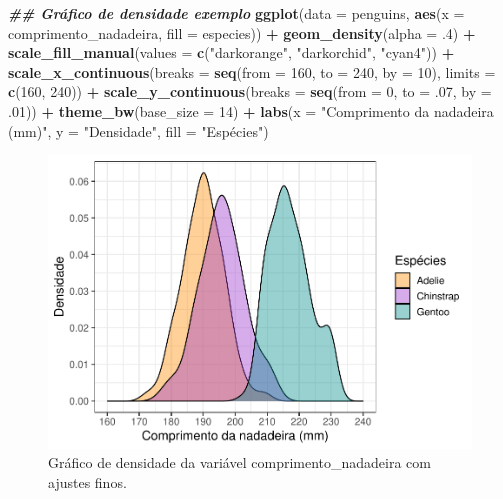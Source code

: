\documentclass[
]{article}
\newenvironment{Shaded}{\begin{snugshade}}{\end{snugshade}}
\newcommand{\AttributeTok}[1]{\textcolor[rgb]{0.13,0.29,0.53}{#1}}
\newcommand{\DecValTok}[1]{\textcolor[rgb]{0.00,0.00,0.81}{#1}}
\newcommand{\DocumentationTok}[1]{\textcolor[rgb]{0.56,0.35,0.01}{\textbf{\textit{#1}}}}
\newcommand{\FunctionTok}[1]{\textcolor[rgb]{0.13,0.29,0.53}{\textbf{#1}}}
\newcommand{\NormalTok}[1]{#1}
\newcommand{\SpecialCharTok}[1]{\textcolor[rgb]{0.81,0.36,0.00}{\textbf{#1}}}
\newcommand{\StringTok}[1]{\textcolor[rgb]{0.31,0.60,0.02}{#1}}
\begin{document}
\begin{Shaded}
\begin{Highlighting}[]
\DocumentationTok{\#\# Gráfico de densidade exemplo}
\FunctionTok{ggplot}\NormalTok{(}\AttributeTok{data =}\NormalTok{ penguins, }\FunctionTok{aes}\NormalTok{(}\AttributeTok{x =}\NormalTok{ comprimento\_nadadeira, }\AttributeTok{fill =}\NormalTok{ especies)) }\SpecialCharTok{+}
    \FunctionTok{geom\_density}\NormalTok{(}\AttributeTok{alpha =}\NormalTok{ .}\DecValTok{4}\NormalTok{) }\SpecialCharTok{+}
    \FunctionTok{scale\_fill\_manual}\NormalTok{(}\AttributeTok{values =} \FunctionTok{c}\NormalTok{(}\StringTok{"darkorange"}\NormalTok{, }\StringTok{"darkorchid"}\NormalTok{, }\StringTok{"cyan4"}\NormalTok{)) }\SpecialCharTok{+}
    \FunctionTok{scale\_x\_continuous}\NormalTok{(}\AttributeTok{breaks =} \FunctionTok{seq}\NormalTok{(}\AttributeTok{from =} \DecValTok{160}\NormalTok{, }\AttributeTok{to =} \DecValTok{240}\NormalTok{, }\AttributeTok{by =} \DecValTok{10}\NormalTok{), }\AttributeTok{limits =} \FunctionTok{c}\NormalTok{(}\DecValTok{160}\NormalTok{, }\DecValTok{240}\NormalTok{)) }\SpecialCharTok{+}
    \FunctionTok{scale\_y\_continuous}\NormalTok{(}\AttributeTok{breaks =} \FunctionTok{seq}\NormalTok{(}\AttributeTok{from =} \DecValTok{0}\NormalTok{, }\AttributeTok{to =}\NormalTok{ .}\DecValTok{07}\NormalTok{, }\AttributeTok{by =}\NormalTok{ .}\DecValTok{01}\NormalTok{)) }\SpecialCharTok{+}
    \FunctionTok{theme\_bw}\NormalTok{(}\AttributeTok{base\_size =} \DecValTok{14}\NormalTok{) }\SpecialCharTok{+}
    \FunctionTok{labs}\NormalTok{(}\AttributeTok{x =} \StringTok{"Comprimento da nadadeira (mm)"}\NormalTok{, }\AttributeTok{y =} \StringTok{"Densidade"}\NormalTok{, }\AttributeTok{fill =} \StringTok{"Espécies"}\NormalTok{)}
\end{Highlighting}
\end{Shaded}

\begin{figure}
\includegraphics[width=0.75\linewidth,height=0.75\textheight]{epr_files/figure-latex/fig-dens-fino-1} \caption{Gráfico de densidade da variável comprimento_nadadeira com ajustes finos.}\label{fig:fig-dens-fino}
\end{figure}
\end{document}
